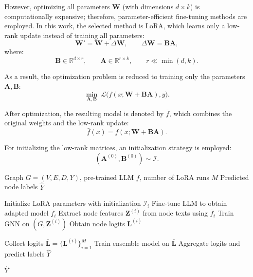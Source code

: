 \documentclass{article}
\begin{document}
However, optimizing all parameters $\mathbf{W}$ (with dimensions $d\times k$) is computationally expensive; therefore, parameter-efficient fine-tuning methods are employed. In this work, the selected method is LoRA, which learns only a low-rank update instead of training all parameters:
\begin{equation}
\mathbf{W}'=\mathbf{W}+\Delta\mathbf{W}, \qquad \Delta\mathbf{W}=\mathbf{B}\mathbf{A},
\end{equation}
where:
\begin{equation}
\mathbf{B}\in\mathbb{R}^{d\times r}, \qquad \mathbf{A}\in\mathbb{R}^{r\times k}, \qquad r\ll \min(d,k).
\end{equation}

As a result, the optimization problem is reduced to training only the parameters $\mathbf{A},\mathbf{B}$:
\begin{equation}
\min_{\mathbf{A},\mathbf{B}} \ \mathcal{L}\big(f(x;\mathbf{W}+\mathbf{B}\mathbf{A}),y\big).
\end{equation}

After optimization, the resulting model is denoted by $\bar{f}$, which combines the original weights and the low-rank update:
\begin{equation}
\bar{f}(x)=f(x;\mathbf{W}+\mathbf{B}\mathbf{A}).
\end{equation}

For initializing the low-rank matrices, an initialization strategy is employed:
\begin{equation}
(\mathbf{A}^{(0)},\mathbf{B}^{(0)})\sim \mathcal{I}.
\end{equation}

\begin{algorithm}[t]
\caption{Proposed DIVERGE Framework}
\label{alg:framework}
\begin{algorithmic}

\REQUIRE Graph $G=(V,E,D,Y)$, pre-trained LLM $f$, number of LoRA runs $M$
\ENSURE Predicted node labels $\hat{Y}$

    \STATE Initialize LoRA parameters with initialization $\mathcal{I}_i$
    \STATE Fine-tune LLM to obtain adapted model $\bar{f}_i$
    \STATE Extract node features $\mathbf{Z}^{(i)}$ from node texts using $\bar{f}_i$
    \STATE Train GNN on $(G,\mathbf{Z}^{(i)})$
    \STATE Obtain node logits $\mathbf{L}^{(i)}$
\ENDFOR

\STATE Collect logits $\bar{\mathbf{L}}=\{\mathbf{L}^{(i)}\}_{i=1}^{M}$
\STATE Train ensemble model on $\bar{\mathbf{L}}$
\STATE Aggregate logits and predict labels $\hat{Y}$

\RETURN $\hat{Y}$

\end{algorithmic}
\end{algorithm}
\end{document}
